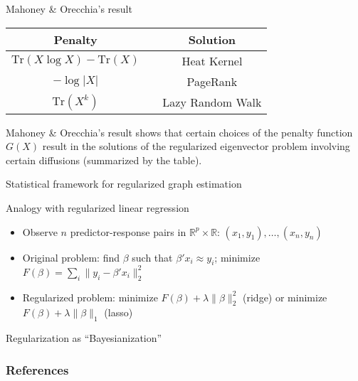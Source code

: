 \documentclass[xcolor=dvipsnames]{beamer}
\begin{document}
\begin{frame}
  \begin{block}{Mahoney \& Orecchia's result}
    \centering
    \begin{tabular}{ccc}
      Penalty &\phantom{MMM} & Solution \\
      \hline
      $\mathrm{Tr}(X \log X) - \mathrm{Tr}(X)$ && Heat Kernel \\
      $- \log |X|$ && PageRank  \\
      $\mathrm{Tr}(X^k)$ && Lazy Random Walk
    \end{tabular}
  \end{block}
  Mahoney \& Orecchia's result shows that certain choices of the penalty
  function $G(X)$ result in the solutions of the regularized eigenvector
  problem involving certain diffusions (summarized by the table).
\end{frame}


\begin{frame}
  \begin{block}{}
  \begin{center}
    \huge{Statistical framework for regularized graph estimation}
  \end{center}
  \end{block}
\end{frame}

\begin{frame}
  \begin{block}{Analogy with regularized linear regression}
  \begin{itemize}
    \item Observe $n$ predictor-response pairs in $\mathbb{R}^p \times \mathbb{R}$:
      $(x_1, y_1), \dotsc, (x_n, y_n)$
    \item Original problem: find $\beta$ such that $\beta' x_i \approx y_i$; minimize $F(\beta) =
    \sum_i \|y_i - \beta' x_i \|_2^2$
    \item Regularized problem: minimize $F(\beta) + \lambda \| \beta \|_2^2$
    (ridge) or minimize $F(\beta) + \lambda \| \beta \|_1$ (lasso)
  \end{itemize}
  \end{block}
\end{frame}

\begin{frame}
  \begin{block}{Regularization as ``Bayesianization''}
  \end{block}
\end{frame}

\begin{frame}
  \frametitle{References}
  
  \footnotesize{
    
  }
\end{frame}
\end{document}
